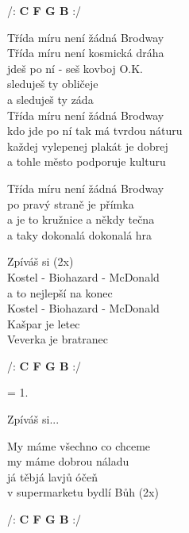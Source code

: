 
\re{}
/: {\footnotesize\textbf{C F G B}} :/

\ve{}
Třída míru není žádná Brodway\\
Třída míru není kosmická dráha\\
jdeš po ní - seš kovboj O.K.\\
sleduješ ty obličeje\\
a sleduješ ty záda\\
Třída míru není žádná Brodway\\
kdo jde po ní tak má tvrdou náturu\\
každej vylepenej plakát je dobrej\\
a tohle město podporuje kulturu

\ve{}
Třída míru není žádná Brodway\\
po pravý straně je přímka \\
a je to kružnice a někdy tečna\\
a taky dokonalá dokonalá hra

Zpíváš si (2x)\\
Kostel - Biohazard - McDonald\\
a to nejlepší na konec\\
Kostel - Biohazard - McDonald\\
Kašpar je letec\\
Veverka je bratranec

\re{}
/: {\footnotesize\textbf{C F G B}} :/

\ve{}
= 1.

Zpíváš si...

\re{*:}
My máme všechno co chceme\\
my máme dobrou náladu\\
já těbjá lavjů óčeň\\
v supermarketu bydlí Bůh (2x)

\re{}
/: {\footnotesize\textbf{C F G B}} :/

\esong{}
